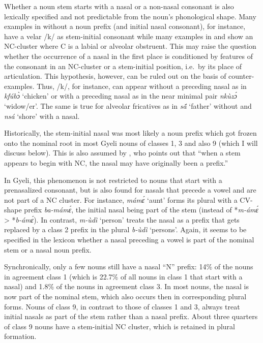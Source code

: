 Whether a noun stem starts with a nasal or a non-nasal consonant is also lexically specified and not predictable from the noun's phonological shape. Many examples in  without a noun prefix (and initial nasal consonant), for instance, have a velar /k/ as stem-initial consonant while many examples in  and  show an NC-cluster where C is a labial or alveolar obstruent. This may raise the question whether the occurrence of a nasal in the first place is conditioned by features of the consonant in an NC-cluster or a stem-initial position, i.e.~by its place of articulation. This hypothesis, however, can be ruled out on the basis of counter-examples. Thus, /k/, for instance, can appear without a preceding nasal as in {\itshape kfúbɔ̀} `chicken' or with a preceding nasal as in the near minimal pair {\itshape nkùzɔ́} `widow/er'. The same is true for alveolar fricatives as in {\itshape sã́} `father' without and {\itshape nsá} `shore' with a nasal.

Historically, the stem-initial nasal was most likely a noun prefix which got frozen onto the nominal root in most Gyeli nouns of classes 1, 3 and also 9 (which I will discuss below). This is also assumed by \citet[50]{hyman2003}, who points out that ``when a stem appears to begin with NC, the nasal may have originally been a prefix.''

In Gyeli, this phenomenon is not restricted to nouns that start with a prenasalized consonant, but is also found for nasals that precede a vowel and are not part of a NC cluster. For instance, {\itshape mámɛ́} `aunt' forms its plural with a CV- shape prefix {\itshape ba-mámɛ́}, the initial nasal being part of the stem (instead of *{\itshape m-ámɛ́} > *{\itshape b-ámɛ́}). In contrast, {\itshape m-ùdì} `person' treats the nasal as a prefix that gets replaced by a class 2 prefix in the plural {\itshape b-ùdì} `persons'. Again, it seems to be specified in the lexicon whether a nasal preceding a vowel is part of the nominal stem or a nasal noun prefix.

Synchronically, only a few nouns still have a nasal ``N'' prefix: 14\% of the nouns in agreement class 1 (which is 22.7\% of all nouns in class 1 that start with a nasal) and 1.8\% of the nouns in agreement class 3.  In most nouns, the nasal is now part of the nominal stem, which also occurs then in corresponding plural forms.  Nouns of class 9, in contrast to those of classes 1 and 3, always treat initial nasals as part of the stem rather than a nasal prefix.  About three quarters of class 9 nouns have a stem-initial NC cluster, which is retained in plural formation.

